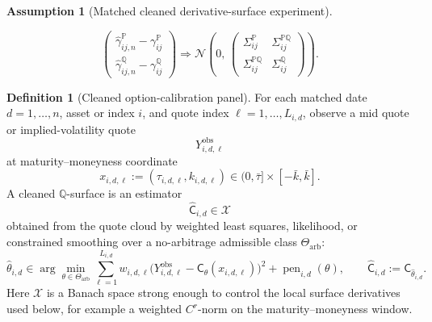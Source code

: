 \documentclass[11pt,a4paper]{amsart}
\theoremstyle{plain}
\theoremstyle{definition}
\newtheorem{definition}[theorem]{Definition}
\newtheorem{assumption}[theorem]{Assumption}
\theoremstyle{remark}
\newcommand{\PP}{\mathbb{P}}
\newcommand{\QQ}{\mathbb{Q}}
\newcommand{\cX}{\mathcal{X}}
\begin{document}
\begin{assumption}[Matched cleaned derivative-surface experiment]
\begin{enumerate}[label=(\roman*)]
\[        \begin{pmatrix}
                \widehat\gamma_{ij,n}^\PP-\gamma_{ij}^\PP\\
                \widehat\gamma_{ij,n}^\QQ-\gamma_{ij}^\QQ
        \end{pmatrix}
        \Rightarrow
        \mathcal N\!\left(
                0,\,
                \begin{pmatrix}
                        \Sigma_{ij}^\PP & \Sigma_{ij}^{\PP\QQ}\\
                        \Sigma_{ij}^{\PP\QQ} & \Sigma_{ij}^\QQ
                \end{pmatrix}
        \right).
\]
\end{enumerate}
\end{assumption}

\begin{definition}[Cleaned option-calibration panel]\label{def:calibration-panel}
For each matched date \(d=1,\dots,n\), asset or index \(i\), and quote index
\(\ell=1,\dots,L_{i,d}\), observe a mid quote or implied-volatility quote
\[
        Y_{i,d,\ell}^{\mathrm{obs}}
\]
at maturity--moneyness coordinate
\[
        x_{i,d,\ell}:=(\tau_{i,d,\ell},k_{i,d,\ell})\in(0,\bar\tau]\times[-\bar k,\bar k].
\]
A cleaned \(\QQ\)-surface is an estimator
\[
        \widehat{\mathsf C}_{i,d}\in\cX
\]
obtained from the quote cloud by weighted least squares, likelihood, or constrained smoothing over
a no-arbitrage admissible class \(\Theta_{\mathrm{arb}}\):
\[
        \widehat\theta_{i,d}
        \in
        \arg\min_{\theta\in\Theta_{\mathrm{arb}}}
        \sum_{\ell=1}^{L_{i,d}}w_{i,d,\ell}
        \bigl(Y_{i,d,\ell}^{\mathrm{obs}}-\mathsf C_\theta(x_{i,d,\ell})\bigr)^2
        +\operatorname{pen}_{i,d}(\theta),
        \qquad
        \widehat{\mathsf C}_{i,d}:=\mathsf C_{\widehat\theta_{i,d}}.
\]
Here \(\cX\) is a Banach space strong enough to control the local surface derivatives used below,
for example a weighted \(C^r\)-norm on the maturity--moneyness window.
\end{definition}
\end{document}
